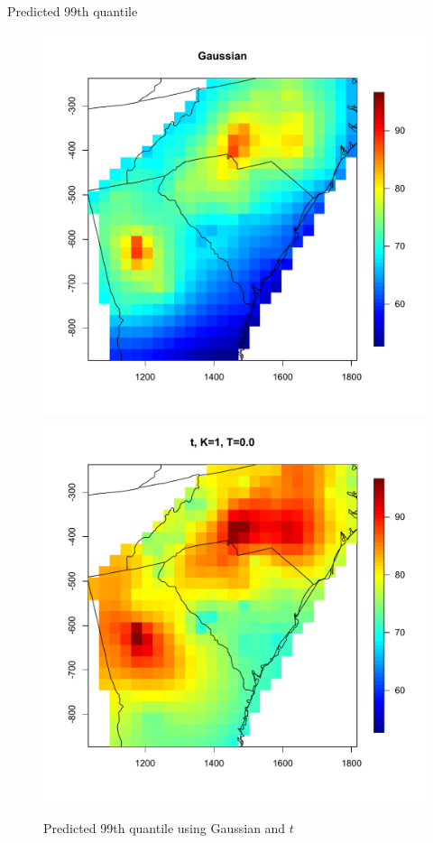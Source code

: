 \documentclass{beamer}
\begin{document}
\begin{frame}{Predicted 99th quantile}
\centering
\begin{figure}
    \includegraphics[width=.5\linewidth]{./plots/quantile-99-gau.pdf}
    \includegraphics[width=.5\linewidth]{./plots/quantile-99-t10.pdf}
    \caption{Predicted 99th quantile using Gaussian and $t$}
\end{figure}
\end{frame}
\end{document}
